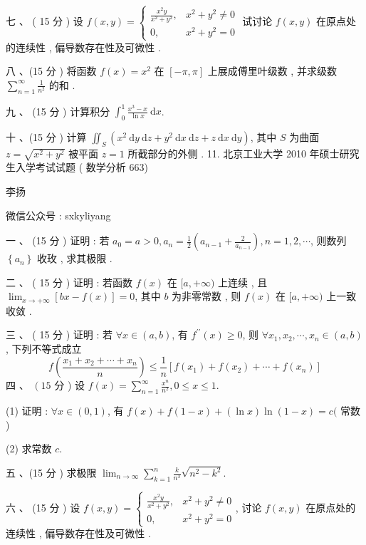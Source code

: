 \documentclass[10pt]{article}
\begin{document}
{ 七 、 ( 15  分 )  设  $f(x, y)=\left\{\begin{array}{cc}\frac{x^{2} y}{x^{2}+y^{2}}, & x^{2}+y^{2} \neq 0 \\ 0, & x^{2}+y^{2}=0\end{array}\right.$  试讨论  $f(x, y)$  在原点处的连续性 , 偏导数存在性及可微性 .

 八 、(15  分 )  将函数  $f(x)=x^{2}$  在  $[-\pi, \pi]$  上展成傅里叶级数 ,  并求级数  $\sum_{n=1}^{\infty} \frac{1}{n^{2}}$  的和 .

 九 、 (15  分 )  计算积分  $\int_{0}^{1} \frac{x^{3}-x}{\ln x} \mathrm{~d} x$.

 十 、(15  分 )  计算  $\iint_{S}\left(x^{2} \mathrm{~d} y \mathrm{~d} z+y^{2} \mathrm{~d} x \mathrm{~d} z+z \mathrm{~d} x \mathrm{~d} y\right)$,  其中  $S$  为曲面  $z=\sqrt{x^{2}+y^{2}}$  被平面  $z=1$  所截部分的外侧 . 11.  北京工业大学  2010  年硕士研究生入学考试试题 ( 数学分析 663)

 李扬 

 微信公众号 : sxkyliyang

 一 、 (15  分 )  证明 :  若  $a_{0}=a>0, a_{n}=\frac{1}{2}\left(a_{n-1}+\frac{2}{a_{n-1}}\right), n=1,2, \cdots$,  则数列  $\left\{a_{n}\right\}$  收玫 ,  求其极限 .

 二 、 ( 15  分 )  证明 :  若函数  $f(x)$  在  $[a,+\infty)$  上连续 ,  且  $\lim _{x \rightarrow+\infty}[b x-f(x)]=0$,  其中  $b$  为非零常数 ,  则  $f(x)$  在  $[a,+\infty)$  上一致收敛 .

 三 、 ( 15  分 )  证明 :  若  $\forall x \in(a, b)$,  有  $f^{\prime \prime}(x) \geq 0$,  则  $\forall x_{1}, x_{2}, \cdots, x_{n} \in(a, b)$,  下列不等式成立 
$$
f\left(\frac{x_{1}+x_{2}+\cdots+x_{n}}{n}\right) \leq \frac{1}{n}\left[f\left(x_{1}\right)+f\left(x_{2}\right)+\cdots+f\left(x_{n}\right)\right]
$$
 四 、 $\left(15\right.$  分 )  设  $f(x)=\sum_{n=1}^{\infty} \frac{x^{n}}{n^{2}}, 0 \leq x \leq 1$.

(1)  证明 : $\forall x \in(0,1)$,  有  $f(x)+f(1-x)+(\ln x) \ln (1-x)=c($  常数 )

(2)  求常数  $c$.

 五 、(15  分 )  求极限  $\lim _{n \rightarrow \infty} \sum_{k=1}^{n} \frac{k}{n^{3}} \sqrt{n^{2}-k^{2}}$.

 六 、 (15  分 )  设  $f(x, y)=\left\{\begin{array}{cc}\frac{x^{2} y}{x^{2}+y^{2}}, & x^{2}+y^{2} \neq 0 \\ 0, & x^{2}+y^{2}=0\end{array}\right.$,  讨论  $f(x, y)$  在原点处的连续性 ,  偏导数存在性及可微性 .

}
\end{document}
